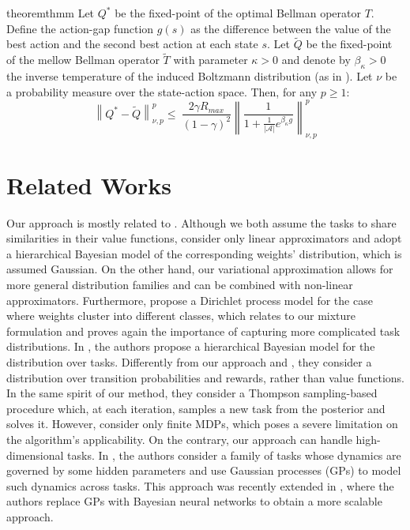 \documentclass{article}
\newcommand{\wt}[1]{\widetilde{#1}}
\newcommand{\norm}[1]{\left\lVert #1 \right\rVert}
\newcommand{\abs}[1]{\left\lvert #1 \right\rvert}
\begin{document}
\begin{restatable}{theorem}{thmm} \label{th:mm}
Let $Q^*$ be the fixed-point of the optimal Bellman operator $T$. Define the action-gap function $g(s)$ as the difference between the value of the best action and the second best action at each state $s$. Let $\wt{Q}$ be the fixed-point of the mellow Bellman operator $\wt{T}$ with parameter $\kappa > 0$ and denote by $\beta_{\kappa} > 0$ the inverse temperature of the induced Boltzmann distribution (as in \cite{asadi2017alternative}). Let $\nu$ be a probability measure over the state-action space. Then, for any $p \geq 1$:
\begin{equation}
\norm{Q^*-\wt{Q}}_{\nu,p}^p \leq\ \frac{2\gamma R_{max}}{(1-\gamma)^2}\norm{\frac{1}{1 + \frac{1}{\abs{\mathcal{A}}}e^{\beta_{\kappa} g}}}_{\nu,p}^p
\end{equation}
\end{restatable}

\section{Related Works}

Our approach is mostly related to \cite{lazaric2010bayesian}. Although we both assume the tasks to share similarities in their value functions, \cite{lazaric2010bayesian} consider only linear approximators and adopt a hierarchical Bayesian model of the corresponding weights' distribution, which is assumed Gaussian. On the other hand, our variational approximation allows for more general distribution families and can be combined with non-linear approximators. Furthermore, \cite{lazaric2010bayesian} propose a Dirichlet process model for the case where weights cluster into different classes, which relates to our mixture formulation and proves again the importance of capturing more complicated task distributions. In \cite{wilson2007multi}, the authors propose a hierarchical Bayesian model for the distribution over tasks. Differently from our approach and \cite{lazaric2010bayesian}, they consider a distribution over transition probabilities and rewards, rather than value functions. In the same spirit of our method, they consider a Thompson sampling-based procedure which, at each iteration, samples a new task from the posterior and solves it. However, \cite{wilson2007multi} consider only finite MDPs, which poses a severe limitation on the algorithm's applicability. On the contrary, our approach can handle high-dimensional tasks. In \cite{doshi2016hidden}, the authors consider a family of tasks whose dynamics are governed by some hidden parameters and use Gaussian processes (GPs) to model such dynamics across tasks. This approach was recently extended in \cite{killian2017robust}, where the authors replace GPs with Bayesian neural networks to obtain a more scalable approach.
\end{document}

